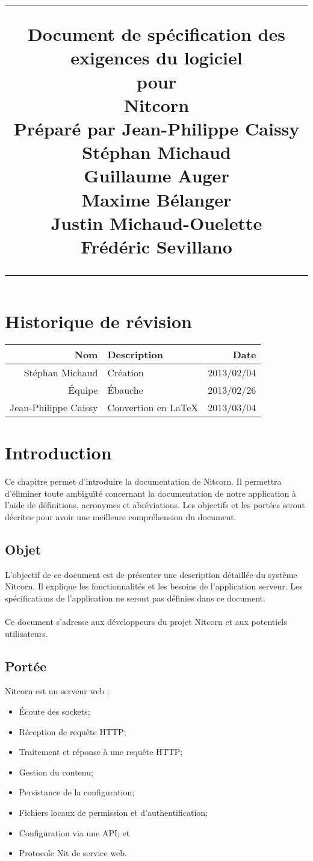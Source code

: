 \documentclass{scrreprt}
\title{%
\flushright
\rule{16cm}{5pt}\vskip1cm
\Huge{Document de spécification des exigences du logiciel}\\
\vspace{2cm}
pour\\
\vspace{2cm}
Nitcorn\\
\vspace{2cm}
Préparé par Jean-Philippe Caissy\\Stéphan Michaud\\Guillaume Auger\\Maxime Bélanger\\Justin Michaud-Ouelette\\Frédéric Sevillano\\
\vfill
\rule{16cm}{5pt}
}
\date{}
\begin{document}
\maketitle
\tableofcontents
\chapter*{Historique de révision}
\begin{tabularx}{\textwidth}{r|X|r}
    \hline
    Nom & Description & Date \\
    \hline
    Stéphan Michaud & Création & 2013/02/04 \\
    \hline
    Équipe & Ébauche & 2013/02/26 \\
    \hline
    Jean-Philippe Caissy & Convertion en \LaTeX & 2013/03/04 \\
    \hline
\end{tabularx}

\chapter{Introduction}
Ce chapitre permet d’introduire la documentation de Nitcorn. Il
permettra d’éliminer toute ambiguïté concernant la documentation
de notre application à l’aide de définitions, acronymes et
abréviations. Les objectifs et les portées seront décrites pour
avoir une meilleure compréhension du document.
\section{Objet}
L’objectif de ce document est de présenter une description
détaillée du système Nitcorn. Il explique les fonctionnalités et
les besoins de l’application serveur. Les spécifications de
l’application ne seront pas définies dans ce document.\\ \\ Ce
document s’adresse aux développeurs du projet Nitcorn et aux
potentiels utilisateurs.
\section{Portée}
Nitcorn est un serveur web :
\begin{itemize}
    \item Écoute des sockets;
    \item Réception de requête HTTP;
    \item Traitement et réponse à une requête HTTP;
    \item Gestion du contenu;
    \item Persistance de la configuration;
    \item Fichiers locaux de permission et d'authentification;
    \item Configuration via une API; et
    \item Protocole Nit de service web.
\end{itemize}
\end{document}
